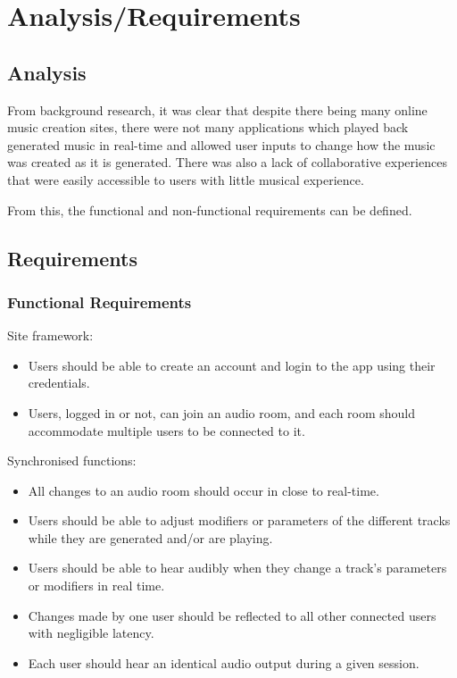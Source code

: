 \chapter{Analysis/Requirements}

\section{Analysis}
From background research, it was clear that despite there being many online music creation sites, there were not many applications which played back generated music in real-time and allowed user inputs to change how the music was created as it is generated. There was also a lack of collaborative experiences that were easily accessible to users with little musical experience.

From this, the functional and non-functional requirements can be defined.

\section{Requirements}

\subsection{Functional Requirements}

Site framework:
\begin{itemize}
    \item 
        Users should be able to create an account and login to the app using their credentials.
    \item 
        Users, logged in or not, can join an audio room, and each room should accommodate multiple users to be connected to it.
\end{itemize}

Synchronised functions:
\begin{itemize}
    \item 
        All changes to an audio room should occur in close to real-time.
    \item 
        Users should be able to adjust modifiers or parameters of the different tracks while they are generated and/or are playing.
    \item 
        Users should be able to hear audibly when they change a track’s parameters or modifiers in real time.
    \item 
        Changes made by one user should be reflected to all other connected users with negligible latency.
    \item 
        Each user should hear an identical audio output during a given session.
\end{itemize}

